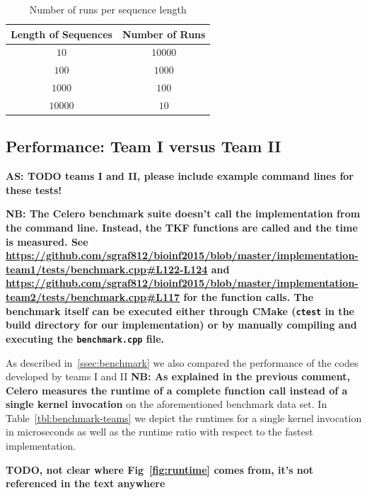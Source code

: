 \documentclass[runningheads,a4paper]{llncs}
\begin{document}
\begin{table}
\centering

\begin{tabular}{|c|c|}
\hline
Length of Sequences & Number of Runs \\
\hline
$10$ & $10000$ \\
\hline
$100$ & $1000$ \\
\hline
$1000$ & $100$ \\
\hline
$10000$ & $10$ \\
\hline
\end{tabular}
\caption{Number of runs per sequence length}
\label{fig:runs}
\end{table}

\subsection{Performance: Team I versus Team II}
\label{team-contest}

{\bf AS: TODO teams I and II, please include example command lines for these tests!} 

{\bf NB: The Celero benchmark suite doesn't call the implementation from the
  command line. Instead, the TKF functions are called and the time is measured.
  See \url{https://github.com/sgraf812/bioinf2015/blob/master/implementation-team1/tests/benchmark.cpp#L122-L124}
  and \url{https://github.com/sgraf812/bioinf2015/blob/master/implementation-team2/tests/benchmark.cpp#L117}
  for the function calls.  The benchmark itself can be executed either through
  CMake (\verb|ctest| in the build directory for our implementation) or by
  manually compiling and executing the \verb|benchmark.cpp| file.}

As described in~\ref{ssec:benchmark} we also compared the performance of the codes developed by teams I and II 
{\bf NB: As explained in the previous comment, Celero measures the runtime of a
complete function call instead of a single kernel invocation}
on the aforementioned benchmark data set. In Table~\ref{tbl:benchmark-teams} we depict the runtimes for a single kernel invocation 
in microseconds  as well as the runtime ratio with respect to the fastest implementation. 

{\bf TODO, not clear where Fig~\ref{fig:runtime} comes from, it's not referenced in the text anywhere}
\end{document}
